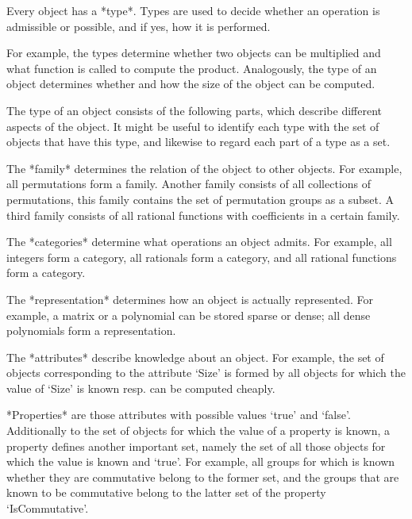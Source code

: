 

Every {\GAP} object has a *type*.
Types are used to decide whether an operation is admissible or possible,
and if yes, how it is performed.

For example, the types determine whether two objects can be multiplied
and what function is called to compute the product.
Analogously, the type of an object determines whether and how the size
of the object can be computed.

The type of an object consists of the following parts,
which describe different aspects of the object.
It might be useful to identify each type with the set of objects that
have this type, and likewise to regard each part of a type as a set.

The *family* determines the relation of the object to other objects.
For example, all permutations form a family.
Another family consists of all collections of permutations,
this family contains the set of permutation groups as a subset.
A third family consists of all rational functions with coefficients
in a certain family.

The *categories* determine what operations an object admits.
For example, all integers form a category, all rationals form a category,
and all rational functions form a category.

The *representation* determines how an object is actually represented.
For example, a matrix or a polynomial can be stored sparse or dense;
all dense polynomials form a representation.

The *attributes* describe knowledge about an object.
For example, the set of objects corresponding to the attribute `Size'
is formed by all objects for which the value of `Size' is known resp.
can be computed cheaply.

*Properties* are those attributes with possible values `true' and
`false'.
Additionally to the set of objects for which the value of a property is
known, a property defines another important set,
namely the set of all those objects for which the value is known and
`true'.
For example, all groups for which is known whether they are commutative
belong to the former set, and the groups that are known to be commutative
belong to the latter set of the property `IsCommutative'.

